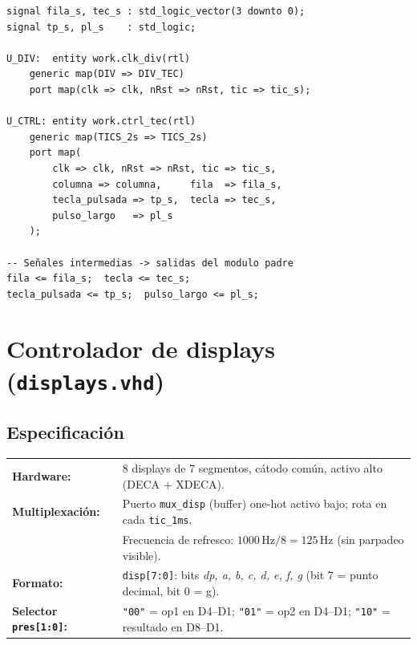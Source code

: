 \documentclass[memoria_final]{subfiles}
\begin{document}
\begin{lstlisting}[caption={Integración en \texttt{interfaz\_teclado.vhd}}]
signal fila_s, tec_s : std_logic_vector(3 downto 0);
signal tp_s, pl_s    : std_logic;

U_DIV:  entity work.clk_div(rtl)
    generic map(DIV => DIV_TEC)
    port map(clk => clk, nRst => nRst, tic => tic_s);

U_CTRL: entity work.ctrl_tec(rtl)
    generic map(TICS_2s => TICS_2s)
    port map(
        clk => clk, nRst => nRst, tic => tic_s,
        columna => columna,     fila  => fila_s,
        tecla_pulsada => tp_s,  tecla => tec_s,
        pulso_largo   => pl_s
    );

-- Señales intermedias -> salidas del modulo padre
fila <= fila_s;  tecla <= tec_s;
tecla_pulsada <= tp_s;  pulso_largo <= pl_s;
\end{lstlisting}

\section{Controlador de displays (\texttt{displays.vhd})}

\subsection{Especificación}

\begin{tcolorbox}[colback=SoftGreen,colframe=MainGreen,boxrule=0.8pt,arc=2pt,
  left=0.5cm,right=0.5cm,top=0.3cm,bottom=0.3cm]
  \small
  \begin{tabular}{ll}
    \textbf{Hardware:}     &
      8 displays de 7 segmentos, cátodo común, activo alto (DECA + XDECA).\\[3pt]
    \textbf{Multiplexación:} &
      Puerto \texttt{mux\_disp} (buffer) one-hot activo bajo; rota en cada
      \texttt{tic\_1ms}.\\
    & Frecuencia de refresco: $1000\,\text{Hz} / 8 = 125\,\text{Hz}$
      (sin parpadeo visible).\\[3pt]
    \textbf{Formato:} &
      \texttt{disp[7:0]}: bits \textit{dp, a, b, c, d, e, f, g}
      (bit 7 = punto decimal, bit 0 = g).\\[3pt]
    \textbf{Selector \texttt{pres[1:0]}:} &
      \texttt{"00"} = op1 en D4--D1;\quad
      \texttt{"01"} = op2 en D4--D1;\quad
      \texttt{"10"} = resultado en D8--D1.
  \end{tabular}
\end{tcolorbox}
\end{document}
